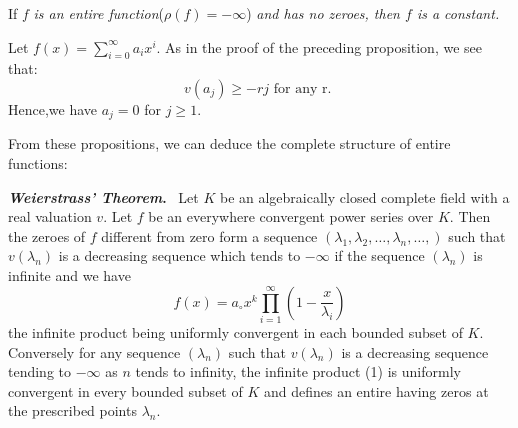 \begin{proposition}\label{part3:chap1:sec2:prop3}
  If $f$ \textit{is an entire
    function}(\iec  $\rho(f)=-\infty$) \textit{and has no zeroes, then
    $f$ is a constant.} 

  Let $f(x)=\sum^{\infty}_{i=0}a_{i}x^{i}$. As in the proof of the
  preceding proposition, we see that: 
  $$
  v(a_{j})\geq -rj\text{ for  any r. }
  $$
  Hence,\pageoriginale we have $a_{j}=0$ for $j\geq1$.
\end{proposition}

From these propositions, we can deduce the complete structure of
entire functions: 

\noindent \textbf{\textit{Weierstrass' Theorem}.} ~Let $K$ be an
algebraically closed 
complete field with a real valuation $v$. Let $f$ be an everywhere
convergent power series over $K$. Then the zeroes of $f$ different
from zero form a sequence
$(\lambda_{1},\lambda_{2},\ldots,\lambda_{n},\ldots,)$ such that
$v(\lambda_{n})$ is a decreasing sequence which tends to $- \infty$ if
the sequence $(\lambda_n)$ is infinite and we have  
\begin{equation*}
  f(x)=a_{\circ}x^{k}\prod^{\infty}_{i=1}
  \left(1-\dfrac{x}{\lambda_{i}}\right) \tag{1}\label{part3:chap1:sec2:eq1}
\end{equation*}
the infinite product being uniformly convergent in each bounded
subset of $K$. Conversely for any sequence $(\lambda_{n})$ such that
$v(\lambda_n)$ is a decreasing sequence tending to $-\infty$ as $n$
tends to infinity, the infinite product (1) is uniformly
convergent in every bounded subset of $K$ and defines an entire having
zeros at the prescribed points $\lambda_{n}$. 

